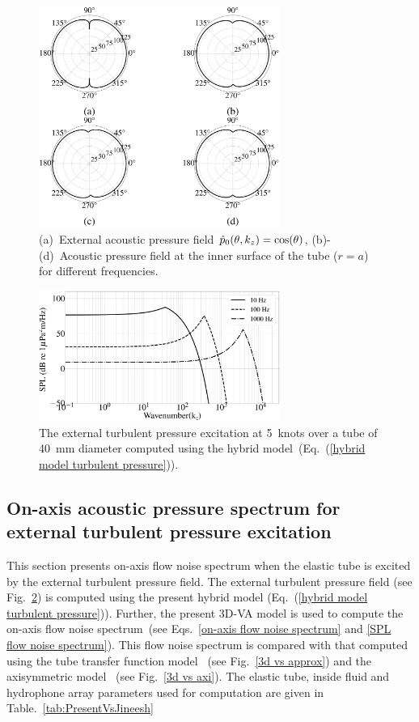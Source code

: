 \documentclass[twocolumn,10pt]{asme2ej}
\begin{document}
\begin{figure}[h]
    \centering
    \includegraphics[width=3.1in]{figure/polarplot_cos(theta).eps}
    \caption{(a)~External acoustic pressure field $\Hat{p}_0(\theta,k_z) =\cos(\theta)$, (b)-(d)~Acoustic pressure field at the inner surface of the tube ($r=a$) for different frequencies.}
    \label{polar plot cos theta}
\end{figure}

\begin{figure}[h]
    \centering
    \includegraphics[width=3.1in]{figure/Comparison_of_turbulent_pressure_spectrum_of_Hybrid.eps}
    \caption{The external turbulent pressure excitation at 5~knots over a tube of 40~mm diameter computed using the hybrid model~(Eq.~(\ref{hybrid model turbulent pressure})).}
    \label{Hybrid turbulent pressure spectrum}
\end{figure}


\subsection{On-axis acoustic pressure spectrum for external turbulent pressure excitation}
\label{Interior pressure}
This section presents on-axis flow noise spectrum when the elastic tube is excited by the external turbulent pressure field. The external turbulent pressure field (see Fig.~\ref{Hybrid turbulent pressure spectrum}) is computed using the present hybrid model (Eq.~(\ref{hybrid model turbulent pressure})). Further, the present 3D-VA model is used to compute the on-axis flow noise spectrum~(see Eqs.~\ref{on-axis flow noise spectrum} and \ref{SPL flow noise spectrum}). This flow noise spectrum is compared with that computed using the tube transfer function model~\cite{knight1996} (see Fig.~\ref{3d vs approx}) and the axisymmetric model~\cite{jineesh2013} (see Fig.~\ref{3d vs axi}). The elastic tube, inside fluid and hydrophone array parameters used for computation are given in Table.~\ref{tab:PresentVsJineesh}
\end{document}
